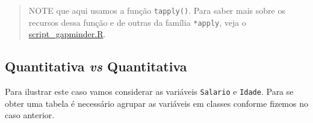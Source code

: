 \documentclass[10pt,a4paper]{book}
\newenvironment{Shaded}{\begin{snugshade}}{\end{snugshade}}
\newcommand{\KeywordTok}[1]{\textcolor[rgb]{0.13,0.29,0.53}{\textbf{#1}}}
\newcommand{\DataTypeTok}[1]{\textcolor[rgb]{0.13,0.29,0.53}{#1}}
\newcommand{\DecValTok}[1]{\textcolor[rgb]{0.00,0.00,0.81}{#1}}
\newcommand{\FloatTok}[1]{\textcolor[rgb]{0.00,0.00,0.81}{#1}}
\newcommand{\StringTok}[1]{\textcolor[rgb]{0.31,0.60,0.02}{#1}}
\newcommand{\OperatorTok}[1]{\textcolor[rgb]{0.81,0.36,0.00}{\textbf{#1}}}
\newcommand{\NormalTok}[1]{#1}
\begin{document}
\begin{Shaded}
\end{Shaded}

\begin{quote}
NOTE que aqui usamos a função \texttt{tapply()}. Para saber mais sobre
os recursos dessa função e de outras da família \texttt{*apply}, veja o
\href{scripts/script_gapminder.R}{script\_gapminder.R}.
\end{quote}

\subsection{\texorpdfstring{Quantitativa \emph{vs}
Quantitativa}{Quantitativa vs Quantitativa}}\label{quantitativa-vs-quantitativa}

Para ilustrar este caso vamos considerar as variáveis \texttt{Salario} e
\texttt{Idade}. Para se obter uma tabela é necessário agrupar as
variáveis em classes conforme fizemos no caso anterior.
\end{document}
